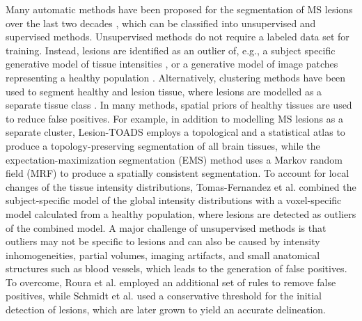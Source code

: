 Many automatic methods have been proposed for the segmentation of MS
\mbox{lesions} over the last two decades \cite{garcia2013review}, which can be
classified into unsupervised and supervised methods. Unsupervised methods do not
require a labeled data set for training. Instead, lesions are identified as an
outlier of, e.g., a subject specific generative model of tissue intensities
\cite{vanleemput2001,tomas2015,schmidt2012automated,roura2015}, or a generative
model of image patches representing a healthy population \cite{weiss2013}.
Alternatively, clustering methods have been used to segment healthy and lesion
tissue, where lesions are modelled as a separate tissue class
\cite{shiee2010topology,sudre2015}.
In many methods, spatial priors of healthy tissues are used to reduce false
positives. For example, in addition to modelling MS lesions as a separate
cluster, Lesion-TOADS \cite{shiee2010topology} employs a topological and a
statistical atlas to produce a topology-preserving segmentation of all brain
tissues, while the expectation-maximization segmentation (EMS)
\cite{vanleemput2001} method uses a Markov random field (MRF) to produce a
spatially consistent segmentation.
To account for local changes of the tissue intensity distributions,
Tomas-Fernandez et al. \cite{tomas2015} combined the subject-specific model of
the global intensity distributions with a voxel-specific model calculated from a
healthy population, where lesions are detected as outliers of the combined
model. A major challenge of unsupervised methods is that outliers may not be
specific to lesions and can also be caused by intensity inhomogeneities, partial
volumes, imaging artifacts, and small anatomical structures such as blood
vessels, which leads to the generation of false positives. To overcome, Roura et
al. \cite{roura2015} employed an additional set of rules to remove false
positives, while Schmidt et al. \cite{schmidt2012automated} used a conservative
threshold for the initial detection of lesions, which are later grown to yield
an accurate delineation.



